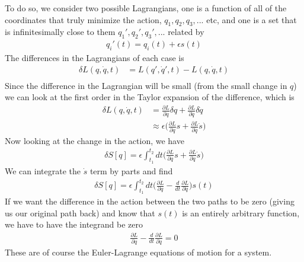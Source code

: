 To do so, we consider two possible Lagrangians, one is a function of all of the coordinates that truly minimize the action, $q_1, q_2, q_3, ... $ etc, and one is a set that is infinitesimally close to them $q_1', q_2', q_3', ...$ related by
\begin{align}
    q_i'(t) = q_i(t) + \epsilon s(t)
\end{align}
The differences in the Lagrangians of each case is
\begin{align}
    \delta L(q,\dot{q},t) &= L(q',\dot{q}',t) - L(q,\dot{q},t)\\
\end{align}
Since the difference in the Lagrangian will be small (from the small change in $q$) we can look at the first order in the Taylor expansion of the difference, which is
\begin{align}
    \delta L(q,\dot{q},t) &= \frac{\partial L}{\partial q} \delta q + \frac{\partial L}{\partial \dot{q}}\delta \dot{q}\\
    &\approx \epsilon\Big( \frac{\partial L}{\partial q} s + \frac{\partial L}{\partial \dot{q}}\dot{s}\Big)
\end{align}
Now looking at the change in the action, we have
\begin{align}
    \delta S[q] = \epsilon\int_{t_1}^{t_2} dt \Big( \frac{\partial L}{\partial q} s + \frac{\partial L}{\partial \dot{q}}\dot{s}\Big)
\end{align}
We can integrate the $\dot{s}$ term by parts and find
\begin{align}
    \delta S[q] = \epsilon\int_{t_1}^{t_2} dt \Big( \frac{\partial L}{\partial q}  - \frac{d}{dt}\frac{\partial L}{\partial \dot{q}}\Big)s(t)
\end{align}
If we want the difference in the action between the two paths to be zero (giving us our original path back) and know that $s(t)$ is an entirely arbitrary function, we have to have the integrand be zero
\begin{align}
    \frac{\partial L}{\partial q}  - \frac{d}{dt}\frac{\partial L}{\partial \dot{q}} = 0
\end{align}
These are of course the Euler-Lagrange equations of motion for a system.






